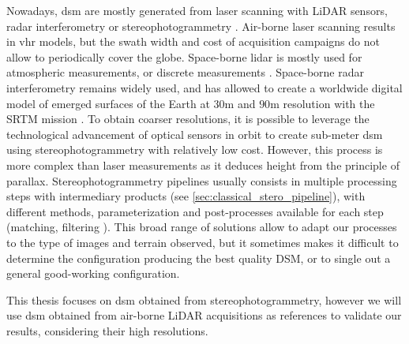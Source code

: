 Nowadays, \acrshort{dsm} are mostly generated from laser scanning with LiDAR sensors, radar interferometry or stereophotogrammetry \cite{youssefi_cars_2020}. Air-borne laser scanning results in \acrfull{vhr} models, but the swath width and cost of acquisition campaigns do not allow to periodically cover the globe. Space-borne \acrshort{lidar} is mostly used for atmospheric measurements, or discrete measurements \cite{fouladinejad_history_2019} . Space-borne radar interferometry remains widely used, and has allowed to create a worldwide digital model of emerged surfaces of the Earth at $30$m and $90$m resolution with the SRTM mission \cite{farr_shuttle_2007}. To obtain coarser resolutions, it is possible to leverage the technological advancement of optical sensors in orbit to create sub-meter \acrshort{dsm} using stereophotogrammetry with relatively low cost. However, this process is more complex than laser measurements as it deduces height from the principle of parallax. Stereophotogrammetry pipelines usually consists in multiple processing steps with intermediary products (see \ref{sec:classical_stero_pipeline}), with different methods, parameterization and post-processes available for each step (\eg matching, filtering \etc). This broad range of solutions allow to adapt our processes to the type of images and terrain observed, but it sometimes makes it difficult to determine the configuration producing the best quality DSM, or to single out a general good-working configuration. 

This thesis focuses on \acrshort{dsm} obtained from stereophotogrammetry, however we will use \acrshort{dsm} obtained from air-borne LiDAR acquisitions as references to validate our results, considering their high resolutions.

